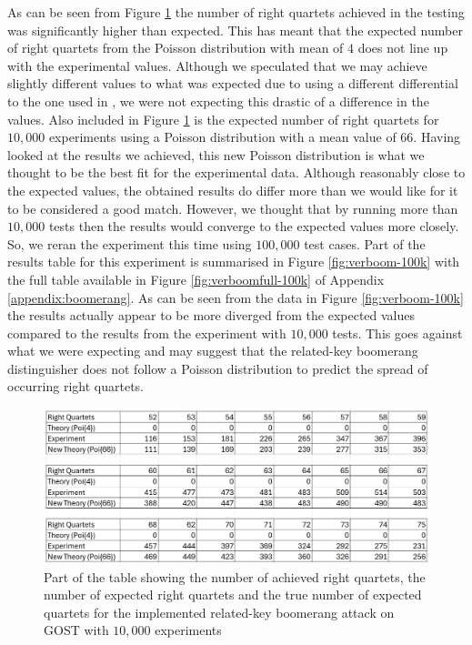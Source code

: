 \documentclass[10pt,journal,compsoc]{IEEEtran}
\begin{document}
As can be seen from Figure \ref{fig:verboom} the number of right quartets achieved in the testing was significantly higher than expected. This has meant that the expected number of right quartets from the Poisson distribution with mean of \(4\) does not line up with the experimental values. Although we speculated that we may achieve slightly different values to what was expected due to using a different differential to the one used in \cite{cryptoeprint:2010/111}, we were not expecting this drastic of a difference in the values. Also included in Figure \ref{fig:verboom} is the expected number of right quartets for \(10,000\) experiments using a Poisson distribution with a mean value of \(66\). Having looked at the results we achieved, this new Poisson distribution is what we thought to be the best fit for the experimental data. Although reasonably close to the expected values, the obtained results do differ more than we would like for it to be considered a good match. However, we thought that by running more than \(10,000\) tests then the results would converge to the expected values more closely. So, we reran the experiment this time using \(100,000\) test cases. Part of the results table for this experiment is summarised in Figure \ref{fig:verboom-100k} with the full table available in Figure \ref{fig:verboomfull-100k} of Appendix \ref{appendix:boomerang}. As can be seen from the data in Figure \ref{fig:verboom-100k} the results actually appear to be more diverged from the expected values compared to the results from the experiment with \(10,000\) tests. This goes against what we were expecting and may suggest that the related-key boomerang distinguisher does not follow a Poisson distribution to predict the spread of occurring right quartets.

\begin{figure}[hbt!]
    \centering
    \includegraphics[width=1\linewidth]{Figures/verBoomTableMid.png}
    \caption{Part of the table showing the number of achieved right quartets, the number of expected right quartets and the true number of expected quartets for the implemented related-key boomerang attack on GOST with \(10,000\) experiments}
    \label{fig:verboom}
\end{figure}
\end{document}
